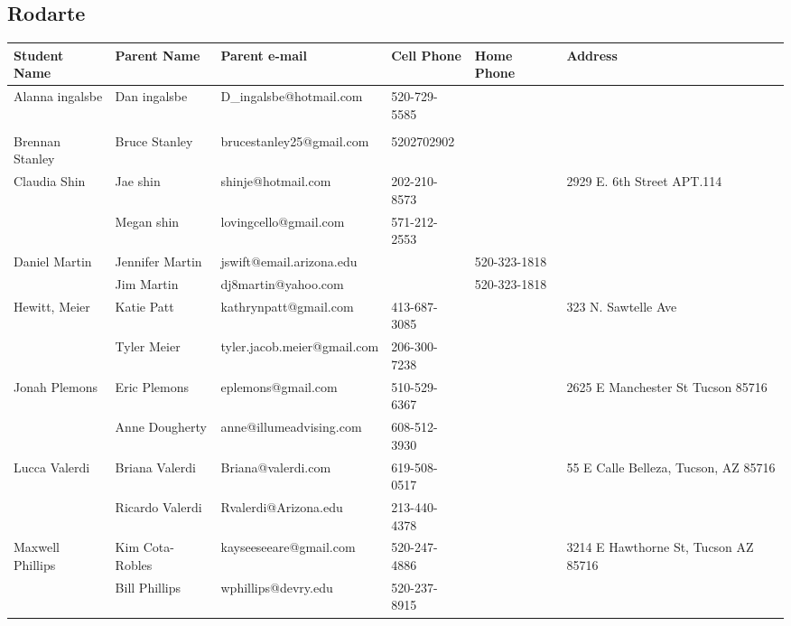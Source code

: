 \documentclass[landscape]{article}\usepackage[]{graphicx}\usepackage[]{color}
\begin{document}
\subsection{Rodarte}
\begin{longtable}{|p{100pt}|p{100pt}|p{140pt}|p{60pt}|p{64pt}|p{120pt}|}
\textbf{Student Name} & \textbf{Parent Name} & \textbf{Parent e-mail} & \textbf{Cell Phone} & \textbf{Home Phone} & \textbf{Address}\\
\hline
\hline
\multirow{2}{100pt}{Alanna ingalsbe} & Dan ingalsbe & D\_ingalsbe@hotmail.com & 520-729-5585 &  & \multirow{2}{120pt}{} \\
 &  &  &  &  & \\
\hline
\multirow{2}{100pt}{Brennan Stanley} & Bruce Stanley & brucestanley25@gmail.com & 5202702902 &  & \multirow{2}{120pt}{} \\
 &  &  &  &  & \\
\hline
\multirow{2}{100pt}{Claudia Shin} & Jae shin & shinje@hotmail.com & 202-210-8573 &  & \multirow{2}{120pt}{2929 E. 6th Street APT.114} \\
 & Megan shin & lovingcello@gmail.com & 571-212-2553 &  & \\
\hline
\multirow{2}{100pt}{Daniel Martin} & Jennifer Martin & jswift@email.arizona.edu &  & 520-323-1818 & \multirow{2}{120pt}{} \\
 & Jim Martin & dj8martin@yahoo.com &  & 520-323-1818 & \\
\hline
\multirow{2}{100pt}{Hewitt, Meier} & Katie Patt & kathrynpatt@gmail.com & 413-687-3085 &  & \multirow{2}{120pt}{323 N. Sawtelle Ave} \\
 & Tyler Meier & tyler.jacob.meier@gmail.com & 206-300-7238 &  & \\
\hline
\multirow{2}{100pt}{Jonah Plemons} & Eric Plemons & eplemons@gmail.com & 510-529-6367 &  & \multirow{2}{120pt}{2625 E Manchester St Tucson 85716} \\
 & Anne Dougherty & anne@illumeadvising.com & 608-512-3930 &  & \\
\hline
\multirow{2}{100pt}{Lucca Valerdi} & Briana Valerdi & Briana@valerdi.com & 619-508-0517 &  & \multirow{2}{120pt}{55 E Calle Belleza, Tucson, AZ 85716} \\
 & Ricardo Valerdi & Rvalerdi@Arizona.edu & 213-440-4378 &  & \\
\hline
\multirow{2}{100pt}{Maxwell Phillips} & Kim Cota-Robles & kayseeseeare@gmail.com & 520-247-4886 &  & \multirow{2}{120pt}{3214 E Hawthorne St, Tucson AZ 85716} \\
 & Bill Phillips & wphillips@devry.edu & 520-237-8915 &  & \\

\end{longtable}
\end{document}
